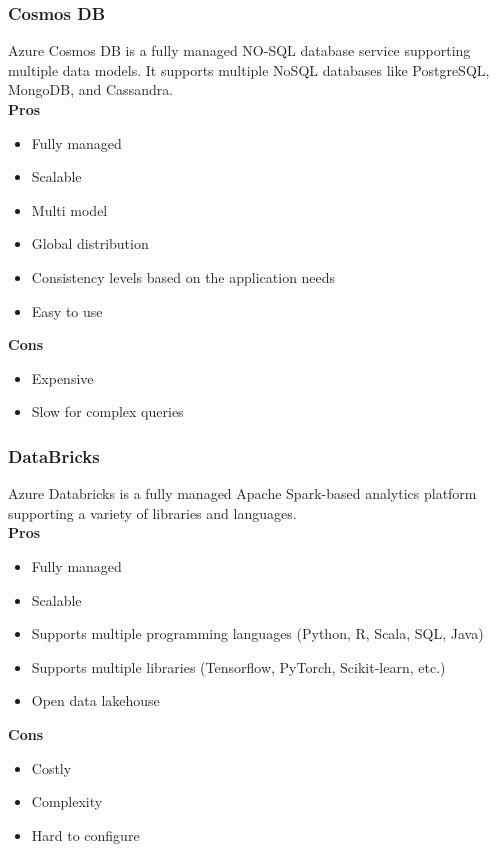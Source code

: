         \subsubsection{Cosmos DB}
        \label{azure:cosmos-db}
        Azure Cosmos DB is a fully managed NO-SQL database service supporting multiple data models. It supports multiple NoSQL databases like PostgreSQL, MongoDB, and Cassandra.\\
        \textbf{Pros}
        \begin{itemize}
            \item Fully managed
            \item Scalable
            \item Multi model
            \item Global distribution
            \item Consistency levels based on the application needs
            \item Easy to use
        \end{itemize}
        \textbf{Cons}
        \begin{itemize}
            \item Expensive
            \item Slow for complex queries
        \end{itemize}

        \subsubsection{DataBricks}
        \label{azure:databricks}
        Azure Databricks is a fully managed Apache Spark-based analytics platform supporting a variety of libraries and languages.\\
        \textbf{Pros}
        \begin{itemize}
            \item Fully managed
            \item Scalable
            \item Supports multiple programming languages (Python, R, Scala, SQL, Java)
            \item Supports multiple libraries (Tensorflow, PyTorch, Scikit-learn, etc.)
            \item Open data lakehouse
        \end{itemize}
        \textbf{Cons}
        \begin{itemize}
            \item Costly
            \item Complexity
            \item Hard to configure
        \end{itemize}

